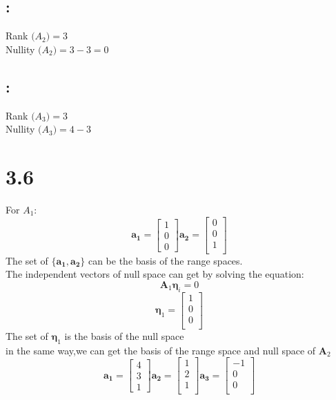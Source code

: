 \documentclass{article}
\newcommand{\rmnum}[1]{\romannumeral #1}
\begin{document}
\subsection*{\rmnum{2}:}
Rank $\boldsymbol(A_2)=3$\\
Nullity $\boldsymbol(A_2)=3-3=0$\\
\subsection*{\rmnum{3}:}
Rank $\boldsymbol(A_3)=3$\\
Nullity $\boldsymbol(A_3)=4-3$

\section*{3.6}
For $A_1$:
\begin{equation*}
\boldsymbol{a_1}=
\left[
\begin{array}{c}
1\\
0\\
0
\end{array}
\right]
\boldsymbol{a_2}=
\left[
\begin{array}{c}
0\\
0\\
1\\
\end{array}
\right]
\end{equation*}
The set of $\{\boldsymbol{a_1},\boldsymbol{a_2}\}$ can be the basis of the range spaces.\\
The independent vectors of null space can get by solving the equation:\\
\[\boldsymbol{A}_1 \boldsymbol{\eta}_i=0\]
\begin{equation*}
\boldsymbol{\eta}_1=
\left[
\begin{array}{c}
1\\
0\\
0\\
\end{array}
\right]
\end{equation*}
The set of ${\boldsymbol{\eta}_1}$ is the basis of the null space\\
in the same way,we can get the basis of the range space and null space of $\boldsymbol{A}_2$
\begin{equation*}
\boldsymbol{a_1}=
\left[
\begin{array}{c}
4\\
3\\
1
\end{array}
\right]
\boldsymbol{a_2}=
\left[
\begin{array}{c}
1\\
2\\
1\\
\end{array}
\right]
\boldsymbol{a_3}=
\left[
\begin{array}{c}
-1\\
0\\
0\\
\end{array}
\right]
\end{equation*}
\end{document}
